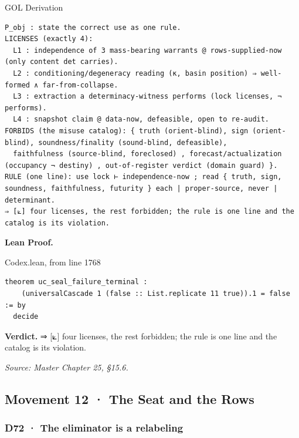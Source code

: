 \documentclass[10pt,twocolumn]{article}
\begin{document}
\begin{golbox}{GOL Derivation}
\begin{lstlisting}[style=golv]
P_obj : state the correct use as one rule.
LICENSES (exactly 4):
  L1 : independence of 3 mass-bearing warrants @ rows-supplied-now (only content det carries).
  L2 : conditioning/degeneracy reading (κ, basin position) ⇒ well-formed ∧ far-from-collapse.
  L3 : extraction a determinacy-witness performs (lock licenses, ¬ performs).
  L4 : snapshot claim @ data-now, defeasible, open to re-audit.
FORBIDS (the misuse catalog): { truth (orient-blind), sign (orient-blind), soundness/finality (sound-blind, defeasible),
  faithfulness (source-blind, foreclosed) , forecast/actualization (occupancy ¬ destiny) , out-of-register verdict (domain guard) }.
RULE (one line): use lock ⊢ independence-now ; read { truth, sign, soundness, faithfulness, futurity } each | proper-source, never | determinant.
⇒ [⟀] four licenses, the rest forbidden; the rule is one line and the catalog is its violation.
\end{lstlisting}
\end{golbox}

\textbf{Lean Proof.}

\begin{leanexcerpt}{Codex.lean, from line 1768}
\begin{lstlisting}[style=leanx,firstnumber=1768]
theorem uc_seal_failure_terminal :
    (universalCascade 1 (false :: List.replicate 11 true)).1 = false := by
  decide
\end{lstlisting}
\end{leanexcerpt}

\textbf{Verdict.} ⇒ {[}⟀{]} four licenses, the rest forbidden; the rule
is one line and the catalog is its violation.

\emph{Source: Master Chapter 25, §15.6.}

\hypertarget{movement-12-the-seat-and-the-rows}{%
\subsection{Movement 12 · The Seat and the
Rows}\label{movement-12-the-seat-and-the-rows}}

\hypertarget{d72-the-eliminator-is-a-relabeling}{%
\subsubsection{D72 · The eliminator is a
relabeling}\label{d72-the-eliminator-is-a-relabeling}}
\end{document}
